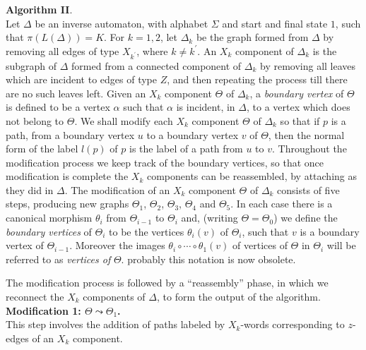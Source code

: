 \documentclass[a4paper,12pt]{article}
\renewcommand{\a}{\alpha }
\newcommand{\D}{\Delta }
\newcommand{\T}{\Theta }
\renewcommand{\S}{\Sigma }
\numberwithin{equation}{section}
\numberwithin{figure}{section}
\begin{document}
\noindent\textbf{Algorithm II}. \\

Let $\D$ be an inverse automaton, with alphabet $\S$ and
start and final state $1$, such that
$\pi(L(\D))=K$.
For $k=1,2$, let $\D_k$ be the graph formed from $\D$ by removing all edges of
type $X_{k^\prime}$, where $k\neq k^\prime$. An $X_k$ component of
$\D_k$ is the subgraph of $\D$ formed from a connected component
of $\D_k$ by removing all leaves which are incident to edges of
type $Z$, and then repeating the process till there are no such
leaves left. Given an $X_k$ component $\T$ of $\D_k$,  a
{\em boundary vertex} of $\T$ is defined to be a vertex
$\a$ such that $\a$ is incident, in $\D$, to a vertex which does not
belong to $\T$.
 We shall modify each  $X_k$ component $\T$ of $\D_k$ so that if $p$ is a path,
from a  boundary vertex $u$  to a boundary vertex $v$ of $\T$,
then the normal form  of  the label $l(p)$ of $p$ is the label of
a path from $u$ to $v$. Throughout the modification process we
keep track of the boundary vertices, so that once modification is
complete the $X_k$ components can be reassembled, by attaching as
they did in $\D$. The modification of an $X_k$ component $\Theta$
of $\D_k$ consists of
five steps, producing new graphs $\T_1$, $\T_2$, $\T_3$, $\T_4$
and $\T_5$. In each case there is a canonical morphism $\theta_i$
from $\T_{i-1}$ to $\T_i$ and,
 (writing $\T=\T_0$)
we define the {\em boundary vertices} of $\T_{i}$ to be the vertices $\theta_{i}(v)$
of $\T_i$, such that $v$ is a boundary vertex of $\T_{i-1}$. Moreover the
 images $\theta_i\circ \cdots\circ \theta_1(v)$ of vertices of $\T$ in $\T_i$ 
will be referred to as  {\em vertices of} $\T$.
{\ajd probably this notation is now obsolete.}


The modification process is followed by a ``reassembly'' phase, in which
we reconnect the $X_k$ components of $\D$, to form the output of the algorithm.
\\[1em]

\noindent\textbf{Modification 1: $\T\leadsto \T_1$.}\\
This step involves the addition of paths labeled by $X_k$-words corresponding to
$z$-edges of an $X_k$ component.
\end{document}
